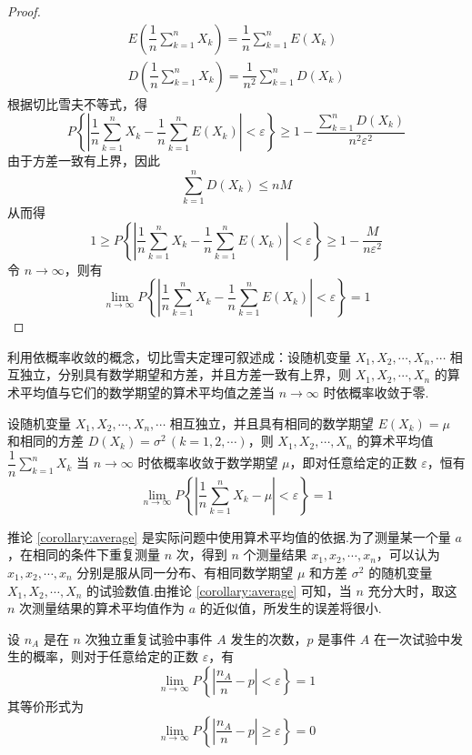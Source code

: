 \begin{proof}
    $$
    \begin{gathered}
        E(\dfrac{1}{n} \sum_{k=1}^n X_k) = \dfrac{1}{n} \sum_{k=1}^n E(X_k) \\
        D(\dfrac{1}{n} \sum_{k=1}^n X_k) = \dfrac{1}{n^2} \sum_{k=1}^n D(X_k)
    \end{gathered}
    $$
    根据切比雪夫不等式，得
    $$
    P \left\{ \left| \dfrac{1}{n} \sum_{k=1}^n X_k - \dfrac{1}{n} \sum_{k=1}^n E(X_k) \right| < \varepsilon \right\} \geqslant 1 - \dfrac{\displaystyle\sum_{k=1}^n D(X_k)}{n^2 \varepsilon^2}
    $$
    由于方差一致有上界，因此
    $$
    \sum_{k=1}^n D(X_k) \leqslant nM
    $$
    从而得
    $$
    1 \geqslant P \left\{ \left| \dfrac{1}{n} \sum_{k=1}^n X_k - \dfrac{1}{n} \sum_{k=1}^n E(X_k) \right| < \varepsilon \right\} \geqslant 1 - \dfrac{M}{n \varepsilon^2}
    $$
    令 $n \to \infty$，则有
    $$
    \lim_{n \to \infty} P \left\{ \left| \dfrac{1}{n} \sum_{k=1}^n X_k - \dfrac{1}{n} \sum_{k=1}^n E(X_k) \right| < \varepsilon \right\} = 1
    $$
\end{proof}

利用依概率收敛的概念，切比雪夫定理可叙述成：设随机变量 $X_1, X_2, \cdots, X_n, \cdots$ 相互独立，分别具有数学期望和方差，并且方差一致有上界，则 $X_1, X_2, \cdots, X_n$ 的算术平均值与它们的数学期望的算术平均值之差当 $n \to \infty$ 时依概率收敛于零.

\begin{corollary} \label{corollary:average}
    设随机变量 $X_1, X_2, \cdots, X_n, \cdots$ 相互独立，并且具有相同的数学期望 $E(X_k) = \mu$ 和相同的方差 $D(X_k) = \sigma^2 \, (k=1,2,\cdots)$，则 $X_1, X_2, \cdots, X_n$ 的算术平均值 $\dfrac{1}{n} \displaystyle\sum_{k=1}^n X_k$ 当 $n \to \infty$ 时依概率收敛于数学期望 $\mu$，即对任意给定的正数 $\varepsilon$，恒有
    $$
    \lim_{n \to \infty} P \left\{ \left| \dfrac{1}{n} \sum_{k=1}^n X_k - \mu \right| < \varepsilon \right\} = 1
    $$
\end{corollary}

推论 \ref{corollary:average} 是实际问题中使用算术平均值的依据.为了测量某一个量 $a$，在相同的条件下重复测量 $n$ 次，得到 $n$ 个测量结果 $x_1,x_2,\cdots,x_n$，可以认为 $x_1,x_2,\cdots,x_n$ 分别是服从同一分布、有相同数学期望 $\mu$ 和方差 $\sigma^2$ 的随机变量 $X_1,X_2,\cdots,X_n$ 的试验数值.由推论 \ref{corollary:average} 可知，当 $n$ 充分大时，取这 $n$ 次测量结果的算术平均值作为 $a$ 的近似值，所发生的误差将很小.

\begin{theorem}[][伯努利定理]
    设 $n_A$ 是在 $n$ 次独立重复试验中事件 $A$ 发生的次数，$p$ 是事件 $A$ 在一次试验中发生的概率，则对于任意给定的正数 $\varepsilon$，有
    $$
    \lim_{n \to \infty} P \left\{ \left| \dfrac{n_A}{n} - p \right| < \varepsilon \right\} = 1
    $$
    其等价形式为
    $$
    \lim_{n \to \infty} P \left\{ \left| \dfrac{n_A}{n} - p \right| \geqslant \varepsilon \right\} = 0
    $$
\end{theorem}

